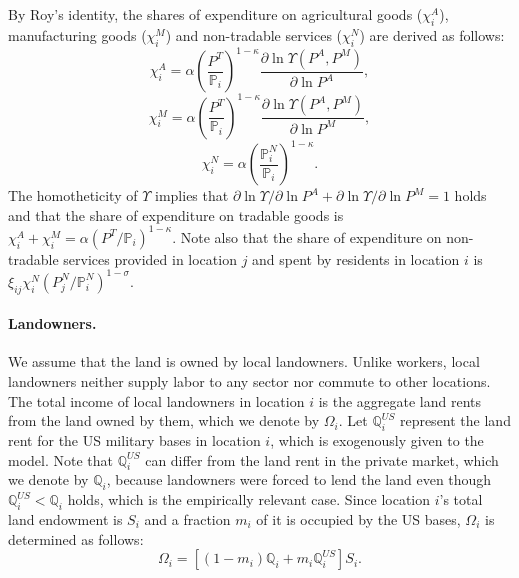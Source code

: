 \documentclass[12pt, unicode, a4paper]{article}
\newcommand{\1}{\mbox{1}\hspace{-0.25em}\mbox{l}} %
\begin{document}
By Roy's identity, the shares of expenditure on agricultural goods ($\chi_{i}^A$), manufacturing goods ($\chi_{i}^M$) and non-tradable services ($\chi_{i}^N$) are derived  as follows:
\begin{equation*}
\label{eq:share_A}
    \chi_{i}^A=\alpha \left( \frac{P^T}{\mathbb{P}_{i}} \right)^{1-\kappa} \frac{\partial \ln{\Upsilon(P^A,P^M)}}{\partial \ln{P^A}},
\end{equation*}
\begin{equation*}
\label{eq:share_M}
    \chi_{i}^M=\alpha \left( \frac{P^T}{\mathbb{P}_{i}} \right)^{1-\kappa} \frac{\partial \ln{\Upsilon(P^A,P^M)}}{\partial \ln{P^M}},
\end{equation*}
\begin{equation}
\label{eq:share_N}
    \chi_{i}^N=\alpha \left( \frac{\mathbb{P}_{i}^N}{\mathbb{P}_{i}} \right)^{1-\kappa}.
\end{equation}
The homotheticity of $\Upsilon$ implies that $\partial \ln{\Upsilon}/\partial \ln{P^A}+\partial \ln{\Upsilon}/\partial \ln{P^M}=1$ holds and that the share of expenditure on tradable goods is $\chi_{i}^A+\chi_{i}^M=\alpha \left( P^T/\mathbb{P}_{i} \right)^{1-\kappa}$. %
Note also that the share of expenditure on non-tradable services provided in location $j$ and spent by residents in location $i$ is $\xi_{ij} \chi_{i}^N \left( P_{j}^N/\mathbb{P}_{i}^N \right)^{1-\sigma}$.

\paragraph{Landowners.}
We assume that the land is owned by local landowners.
Unlike workers, local landowners neither supply labor to any sector nor commute to other locations. The total income of local landowners in location $i$ is the aggregate land rents from the land owned by them, which we denote by $\Omega_i$. Let $\mathbb{Q}_i^{US}$ represent the land rent for the US military bases in location $i$, which is exogenously given to the model. 
Note that $\mathbb{Q}_i^{US}$ can differ from the land rent in the private market, which we denote by $\mathbb{Q}_i$, because landowners were forced to lend the land even though $\mathbb{Q}_i^{US} < \mathbb{Q}_i$ holds, which is the empirically relevant case. 
Since location $i$'s total land endowment is $S_i$ and a fraction $m_i$ of it is occupied by the US bases, $\Omega_i$ is determined as follows: 
\begin{equation}
\label{eq:landowner_income}
    \Omega_i=[(1-m_i)\mathbb{Q}_i+m_i\mathbb{Q}_i^{US}]S_i.
\end{equation}
\end{document}
